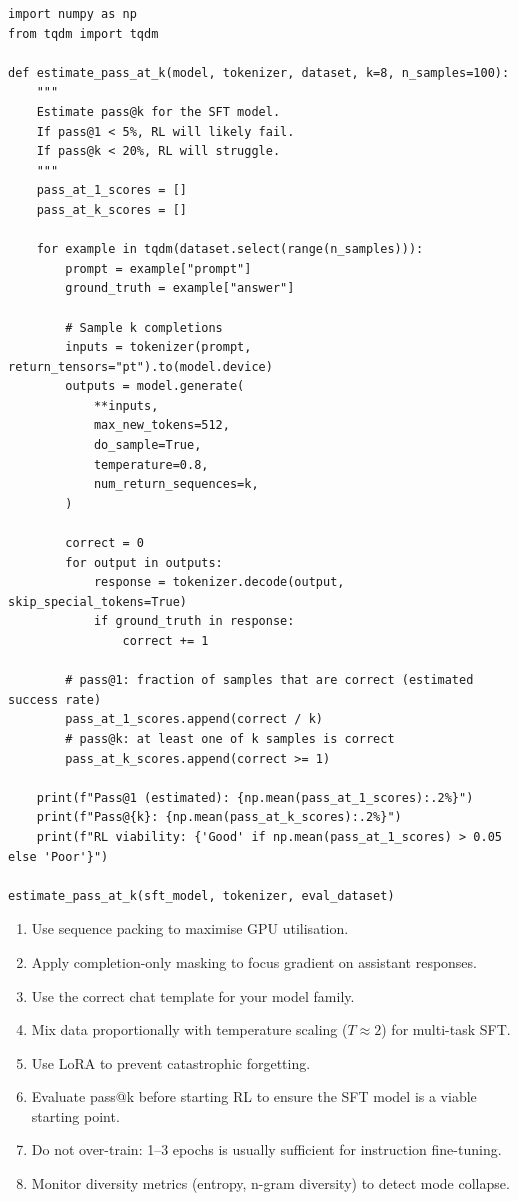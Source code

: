 \begin{examplebox}
\begin{lstlisting}[style=pythonstyle]
import numpy as np
from tqdm import tqdm

def estimate_pass_at_k(model, tokenizer, dataset, k=8, n_samples=100):
    """
    Estimate pass@k for the SFT model.
    If pass@1 < 5%, RL will likely fail.
    If pass@k < 20%, RL will struggle.
    """
    pass_at_1_scores = []
    pass_at_k_scores = []

    for example in tqdm(dataset.select(range(n_samples))):
        prompt = example["prompt"]
        ground_truth = example["answer"]

        # Sample k completions
        inputs = tokenizer(prompt, return_tensors="pt").to(model.device)
        outputs = model.generate(
            **inputs,
            max_new_tokens=512,
            do_sample=True,
            temperature=0.8,
            num_return_sequences=k,
        )

        correct = 0
        for output in outputs:
            response = tokenizer.decode(output, skip_special_tokens=True)
            if ground_truth in response:
                correct += 1

        # pass@1: fraction of samples that are correct (estimated success rate)
        pass_at_1_scores.append(correct / k)
        # pass@k: at least one of k samples is correct
        pass_at_k_scores.append(correct >= 1)

    print(f"Pass@1 (estimated): {np.mean(pass_at_1_scores):.2%}")
    print(f"Pass@{k}: {np.mean(pass_at_k_scores):.2%}")
    print(f"RL viability: {'Good' if np.mean(pass_at_1_scores) > 0.05 else 'Poor'}")

estimate_pass_at_k(sft_model, tokenizer, eval_dataset)
\end{lstlisting}
\end{examplebox}

\begin{keybox}
\begin{enumerate}
  \item Use sequence packing to maximise GPU utilisation.
  \item Apply completion-only masking to focus gradient on assistant responses.
  \item Use the correct chat template for your model family.
  \item Mix data proportionally with temperature scaling ($T \approx 2$) for multi-task SFT.
  \item Use LoRA to prevent catastrophic forgetting.
  \item Evaluate pass@k before starting RL to ensure the SFT model is a viable starting point.
  \item Do not over-train: 1--3 epochs is usually sufficient for instruction fine-tuning.
  \item Monitor diversity metrics (entropy, n-gram diversity) to detect mode collapse.
\end{enumerate}
\end{keybox}

